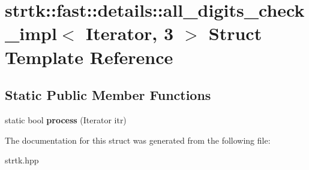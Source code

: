 \hypertarget{structstrtk_1_1fast_1_1details_1_1all__digits__check__impl_3_01Iterator_00_013_01_4}{\section{strtk\-:\-:fast\-:\-:details\-:\-:all\-\_\-digits\-\_\-check\-\_\-impl$<$ Iterator, 3 $>$ Struct Template Reference}
\label{structstrtk_1_1fast_1_1details_1_1all__digits__check__impl_3_01Iterator_00_013_01_4}
}
\subsection*{Static Public Member Functions}
\begin{DoxyCompactItemize}
\item 
\hypertarget{structstrtk_1_1fast_1_1details_1_1all__digits__check__impl_3_01Iterator_00_013_01_4_ac8c519217b8b84d88248b600620d0310}{static bool {\bfseries process} (Iterator itr)}\label{structstrtk_1_1fast_1_1details_1_1all__digits__check__impl_3_01Iterator_00_013_01_4_ac8c519217b8b84d88248b600620d0310}

\end{DoxyCompactItemize}


The documentation for this struct was generated from the following file\-:\begin{DoxyCompactItemize}
\item 
strtk.\-hpp\end{DoxyCompactItemize}
